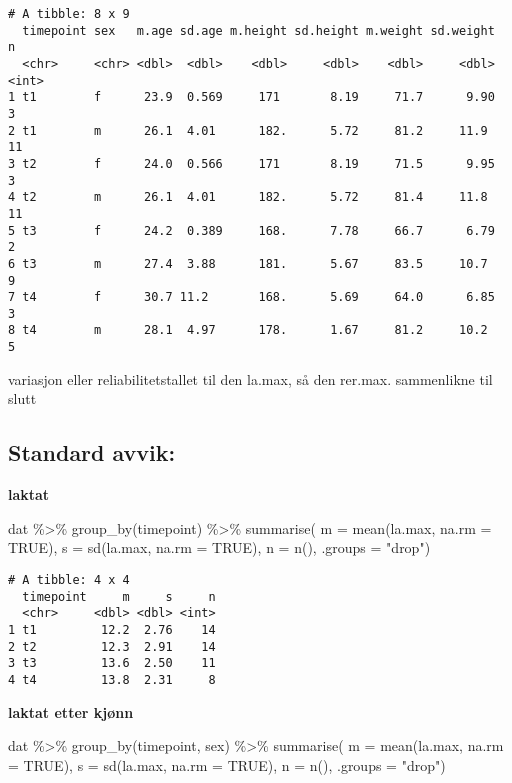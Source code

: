 \documentclass[
  letterpaper,
  DIV=11,
  numbers=noendperiod]{scrreprt}
\newenvironment{Shaded}{\begin{snugshade}}{\end{snugshade}}
\newcommand{\AttributeTok}[1]{\textcolor[rgb]{0.40,0.45,0.13}{#1}}
\newcommand{\ConstantTok}[1]{\textcolor[rgb]{0.56,0.35,0.01}{#1}}
\newcommand{\FunctionTok}[1]{\textcolor[rgb]{0.28,0.35,0.67}{#1}}
\newcommand{\NormalTok}[1]{\textcolor[rgb]{0.00,0.23,0.31}{#1}}
\newcommand{\SpecialCharTok}[1]{\textcolor[rgb]{0.37,0.37,0.37}{#1}}
\newcommand{\StringTok}[1]{\textcolor[rgb]{0.13,0.47,0.30}{#1}}
\begin{document}
\begin{verbatim}
# A tibble: 8 x 9
  timepoint sex   m.age sd.age m.height sd.height m.weight sd.weight     n
  <chr>     <chr> <dbl>  <dbl>    <dbl>     <dbl>    <dbl>     <dbl> <int>
1 t1        f      23.9  0.569     171       8.19     71.7      9.90     3
2 t1        m      26.1  4.01      182.      5.72     81.2     11.9     11
3 t2        f      24.0  0.566     171       8.19     71.5      9.95     3
4 t2        m      26.1  4.01      182.      5.72     81.4     11.8     11
5 t3        f      24.2  0.389     168.      7.78     66.7      6.79     2
6 t3        m      27.4  3.88      181.      5.67     83.5     10.7      9
7 t4        f      30.7 11.2       168.      5.69     64.0      6.85     3
8 t4        m      28.1  4.97      178.      1.67     81.2     10.2      5
\end{verbatim}

variasjon eller reliabilitetstallet til den la.max, så den rer.max.
sammenlikne til slutt

\subsection{Standard avvik:}\label{standard-avvik}

\textbf{laktat}

\begin{Shaded}
\begin{Highlighting}[]
\NormalTok{dat }\SpecialCharTok{\%\textgreater{}\%}
  \FunctionTok{group\_by}\NormalTok{(timepoint) }\SpecialCharTok{\%\textgreater{}\%}
  \FunctionTok{summarise}\NormalTok{(}
    \AttributeTok{m =} \FunctionTok{mean}\NormalTok{(la.max, }\AttributeTok{na.rm =} \ConstantTok{TRUE}\NormalTok{),}
    \AttributeTok{s =} \FunctionTok{sd}\NormalTok{(la.max, }\AttributeTok{na.rm =} \ConstantTok{TRUE}\NormalTok{),}
     \AttributeTok{n =} \FunctionTok{n}\NormalTok{(),}
    \AttributeTok{.groups =} \StringTok{"drop"}\NormalTok{)}
\end{Highlighting}
\end{Shaded}

\begin{verbatim}
# A tibble: 4 x 4
  timepoint     m     s     n
  <chr>     <dbl> <dbl> <int>
1 t1         12.2  2.76    14
2 t2         12.3  2.91    14
3 t3         13.6  2.50    11
4 t4         13.8  2.31     8
\end{verbatim}

\textbf{laktat etter kjønn}

\begin{Shaded}
\begin{Highlighting}[]
\NormalTok{dat }\SpecialCharTok{\%\textgreater{}\%}
  \FunctionTok{group\_by}\NormalTok{(timepoint, sex) }\SpecialCharTok{\%\textgreater{}\%}
  \FunctionTok{summarise}\NormalTok{(}
    \AttributeTok{m =} \FunctionTok{mean}\NormalTok{(la.max, }\AttributeTok{na.rm =} \ConstantTok{TRUE}\NormalTok{),}
    \AttributeTok{s =} \FunctionTok{sd}\NormalTok{(la.max, }\AttributeTok{na.rm =} \ConstantTok{TRUE}\NormalTok{),}
     \AttributeTok{n =} \FunctionTok{n}\NormalTok{(),}
    \AttributeTok{.groups =} \StringTok{"drop"}\NormalTok{)}
\end{Highlighting}
\end{Shaded}
\end{document}
